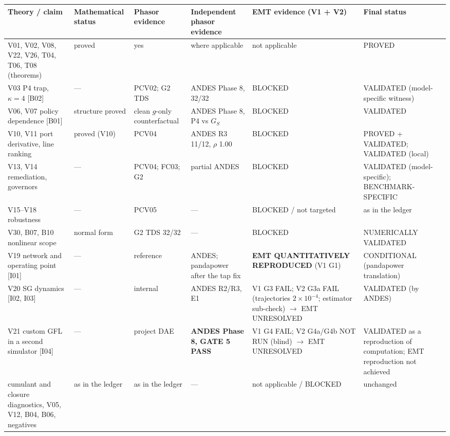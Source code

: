\documentclass[10pt,a4paper]{article}
\begin{document}
{\footnotesize
\begin{longtable}{@{}L{3.0cm}L{1.5cm}L{2.0cm}L{2.2cm}L{3.3cm}L{2.8cm}@{}}
\toprule
Theory / claim & Mathem\-atical status & Phasor evidence & Independent phasor evidence & EMT evidence (V1 + V2) & Final status\\
\midrule\endhead
V01, V02, V08, V22, V26, T04, T06, T08 (theorems) & proved & yes & where applicable & not applicable & PROVED\\
V03 P4 trap, $\kappa=4$ [B02] & --- & PCV02; G2 TDS & ANDES Phase 8, 32/32 & BLOCKED & VALIDATED (model-specific witness)\\
V06, V07 policy dependence [B01] & structure proved & clean $g$-only counterfactual & ANDES Phase 8, P4 vs $G_S$ & BLOCKED & VALIDATED\\
V10, V11 port derivative, line ranking & proved (V10) & PCV04 & ANDES R3 11/12, $\rho$ 1.00 & BLOCKED & PROVED + VALIDATED; VALIDATED (local)\\
V13, V14 remediation, governors & --- & PCV04; FC03; G2 & partial ANDES & BLOCKED & VALIDATED (model-specific); BENCHMARK-SPECIFIC\\
V15--V18 robustness & --- & PCV05 & --- & BLOCKED / not targeted & as in the ledger\\
V30, B07, B10 nonlinear scope & normal form & G2 TDS 32/32 & --- & BLOCKED & NUMERICALLY VALIDATED\\
V19 network and operating point [I01] & --- & reference & ANDES; pandapower after the tap fix & \textbf{EMT QUANTITATIVELY REPRODUCED} (V1 G1) & CONDITIONAL (pandapower translation)\\
V20 SG dynamics [I02, I03] & --- & internal & ANDES R2/R3, E1 & V1 G3 FAIL; V2 G3a FAIL (trajectories $2\times10^{-4}$; estimator sub-check) $\to$ EMT UNRESOLVED & VALIDATED (by ANDES)\\
V21 custom GFL in a second simulator [I04] & --- & project DAE & \textbf{ANDES Phase 8, GATE 5 PASS} & V1 G4 FAIL; V2 G4a/G4b NOT RUN (blind) $\to$ EMT UNRESOLVED & VALIDATED as a reproduction of computation; EMT reproduction not achieved\\
cumulant and closure diagnostics, V05, V12, B04, B06, negatives & as in the ledger & as in the ledger & --- & not applicable / BLOCKED & unchanged\\
\bottomrule
\end{longtable}}
\end{document}
